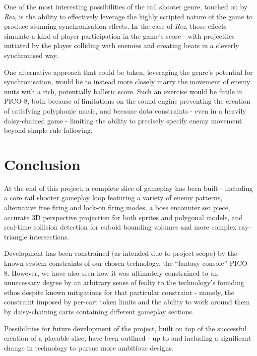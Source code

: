 \documentclass[11pt]{article}
\begin{document}
One of the most interesting possibilities of the rail shooter genre, touched on by \textit{Rez}, is the ability
to effectively leverage the highly scripted nature of the game to produce stunning synchronisation effects.
In the case of \textit{Rez}, those effects simulate a kind of player participation in the game's score - with
projectiles initiated by the player colliding with enemies and creating beats in a cleverly synchronised way.

One alternative approach that could be taken, leveraging the genre's potential for synchronisation, would be to
instead more closely marry the movement of enemy units with a rich, potentially balletic score. Such an exercise
would be futile in PICO-8, both because of limitations on the sound engine preventing the creation of satisfying
polyphonic music, and because data constraints - even in a heavily daisy-chained game - limiting the ability to
precisely specify enemy movement beyond simple rule following.

\section{Conclusion}
At the end of this project, a complete slice of gameplay has been built - including
a core rail shooter gameplay loop featuring a variety of enemy patterns, alternative free
firing and lock-on firing modes, a boss encounter set piece, 
accurate 3D perspective projection for both sprites and polygonal models,
and real-time collision detection for cuboid bounding volumes and
more complex ray-triangle intersections.

Development has been constrained (as intended due to project scope) by the known
system constraints of our chosen technology, the ``fantasy console'' PICO-8. However,
we have also seen how it was ultimately constrained to an unnecessary degree by
an arbitrary sense of fealty to the technology's founding ethos despite known
mitigations for that particular constraint - namely, the constraint imposed by
per-cart token limits and the ability to work around them by daisy-chaining
carts containing different gameplay sections.

Possibilities for future development of the project, built on top of the successful
creation of a playable slice, have been outlined - up to and including a significant
change in technology to pursue more ambitious designs.

\printbibliography
\end{document}
